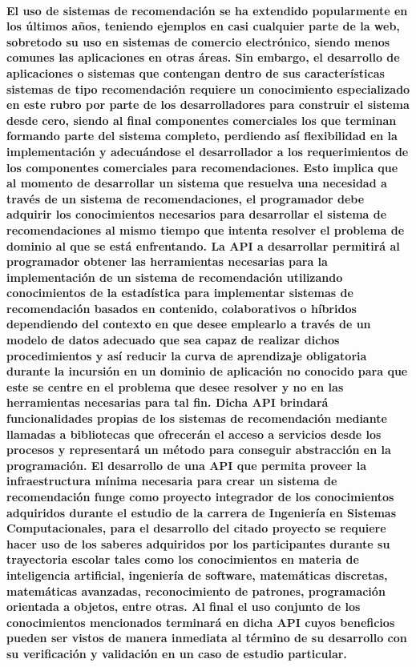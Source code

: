     \paragraph{El uso de sistemas de recomendación se ha extendido popularmente en los últimos años, teniendo ejemplos en casi cualquier parte de la web, sobretodo su uso en sistemas de comercio electrónico, siendo menos comunes las aplicaciones en otras áreas. Sin embargo, el desarrollo de aplicaciones o sistemas que contengan dentro de sus características sistemas de tipo recomendación requiere un conocimiento especializado en este rubro por parte de los desarrolladores para construir el sistema desde cero, siendo al final componentes comerciales los que terminan formando parte del sistema completo, perdiendo así flexibilidad en la implementación y adecuándose el desarrollador a los requerimientos de los componentes comerciales para recomendaciones. Esto implica que al momento de desarrollar un sistema que resuelva una necesidad a través de un sistema de recomendaciones, el programador debe adquirir los conocimientos necesarios para desarrollar el sistema de recomendaciones al mismo tiempo que intenta resolver el problema de dominio al que se está enfrentando. La API a desarrollar permitirá al programador obtener las herramientas necesarias para la implementación de un sistema de recomendación utilizando conocimientos de la estadística para implementar sistemas de recomendación basados en contenido, colaborativos o híbridos dependiendo del contexto en que desee emplearlo a través de un modelo de datos adecuado que sea capaz de realizar dichos procedimientos y así reducir la curva de aprendizaje obligatoria durante la incursión en un dominio de aplicación no conocido para que este se centre en el problema que desee resolver y no en las herramientas necesarias para tal fin. Dicha API brindará funcionalidades propias de los sistemas de recomendación mediante llamadas a bibliotecas que ofrecerán el acceso a servicios desde los procesos y representará un método para conseguir abstracción en la programación. El desarrollo de una API que permita proveer la infraestructura mínima necesaria para crear un sistema de recomendación funge como proyecto integrador de los conocimientos adquiridos durante el estudio de la carrera de Ingeniería en Sistemas Computacionales, para el desarrollo del citado proyecto se requiere hacer uso de los saberes adquiridos por los participantes durante su trayectoria escolar tales como los conocimientos en materia de inteligencia artificial, ingeniería de software, matemáticas discretas, matemáticas avanzadas, reconocimiento de patrones, programación orientada a objetos, entre otras. Al final el uso conjunto de los conocimientos mencionados terminará en dicha API cuyos beneficios pueden ser vistos de manera inmediata al término de su desarrollo con su verificación y validación en un caso de estudio particular.}
